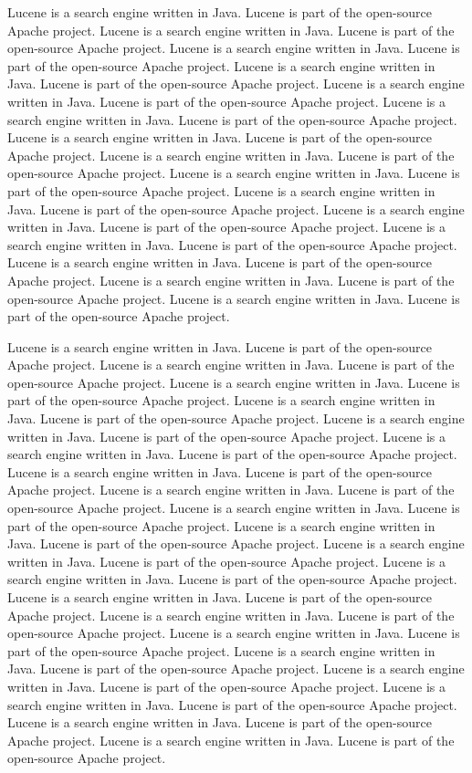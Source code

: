 \documentclass[10pt]{book}
\begin{document}
\noindent
Lucene is a search engine written in Java.  Lucene is part of the
open-source Apache project.
Lucene is a search engine written in Java.  Lucene is part of the
open-source Apache project.
Lucene is a search engine written in Java.  Lucene is part of the
open-source Apache project.
Lucene is a search engine written in Java.  Lucene is part of the
open-source Apache project.
Lucene is a search engine written in Java.  Lucene is part of the
open-source Apache project.
Lucene is a search engine written in Java.  Lucene is part of the
open-source Apache project.
Lucene is a search engine written in Java.  Lucene is part of the
open-source Apache project.
Lucene is a search engine written in Java.  Lucene is part of the
open-source Apache project.
Lucene is a search engine written in Java.  Lucene is part of the
open-source Apache project.
Lucene is a search engine written in Java.  Lucene is part of the
open-source Apache project.
Lucene is a search engine written in Java.  Lucene is part of the
open-source Apache project.
Lucene is a search engine written in Java.  Lucene is part of the
open-source Apache project.
Lucene is a search engine written in Java.  Lucene is part of the
open-source Apache project.
Lucene is a search engine written in Java.  Lucene is part of the
open-source Apache project.
Lucene is a search engine written in Java.  Lucene is part of the
open-source Apache project.

Lucene is a search engine written in Java.  Lucene is part of the
open-source Apache project.
Lucene is a search engine written in Java.  Lucene is part of the
open-source Apache project.
Lucene is a search engine written in Java.  Lucene is part of the
open-source Apache project.
Lucene is a search engine written in Java.  Lucene is part of the
open-source Apache project.
Lucene is a search engine written in Java.  Lucene is part of the
open-source Apache project.
Lucene is a search engine written in Java.  Lucene is part of the
open-source Apache project.
Lucene is a search engine written in Java.  Lucene is part of the
open-source Apache project.
Lucene is a search engine written in Java.  Lucene is part of the
open-source Apache project.
Lucene is a search engine written in Java.  Lucene is part of the
open-source Apache project.
Lucene is a search engine written in Java.  Lucene is part of the
open-source Apache project.
Lucene is a search engine written in Java.  Lucene is part of the
open-source Apache project.
Lucene is a search engine written in Java.  Lucene is part of the
open-source Apache project.
Lucene is a search engine written in Java.  Lucene is part of the
open-source Apache project.
Lucene is a search engine written in Java.  Lucene is part of the
open-source Apache project.
Lucene is a search engine written in Java.  Lucene is part of the
open-source Apache project.
Lucene is a search engine written in Java.  Lucene is part of the
open-source Apache project.
Lucene is a search engine written in Java.  Lucene is part of the
open-source Apache project.
Lucene is a search engine written in Java.  Lucene is part of the
open-source Apache project.
Lucene is a search engine written in Java.  Lucene is part of the
open-source Apache project.
Lucene is a search engine written in Java.  Lucene is part of the
open-source Apache project.
\end{document}
